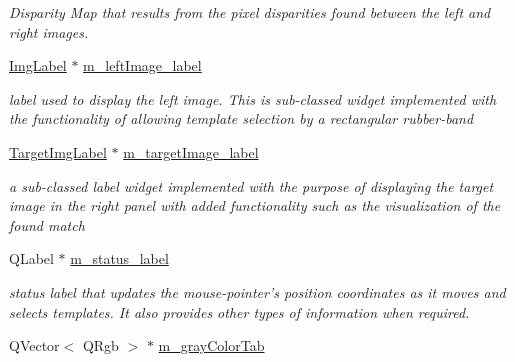 \begin{CompactItemize}
\begin{CompactList}\small\item\em Disparity Map that results from the pixel disparities found between the left and right images. \item\end{CompactList}\item 
\hypertarget{classQcorr_cadb3032fbf41f8f1b27067c2784efef}{
\hyperlink{classImgLabel}{ImgLabel} $\ast$ \hyperlink{classQcorr_cadb3032fbf41f8f1b27067c2784efef}{m\_\-leftImage\_\-label}}
\label{classQcorr_cadb3032fbf41f8f1b27067c2784efef}

\begin{CompactList}\small\item\em label used to display the left image. This is sub-classed widget implemented with the functionality of allowing template selection by a rectangular rubber-band \item\end{CompactList}\item 
\hypertarget{classQcorr_8d1e1ab866a811003c435c45de1e958e}{
\hyperlink{classTargetImgLabel}{TargetImgLabel} $\ast$ \hyperlink{classQcorr_8d1e1ab866a811003c435c45de1e958e}{m\_\-targetImage\_\-label}}
\label{classQcorr_8d1e1ab866a811003c435c45de1e958e}

\begin{CompactList}\small\item\em a sub-classed label widget implemented with the purpose of displaying the target image in the right panel with added functionality such as the visualization of the found match \item\end{CompactList}\item 
\hypertarget{classQcorr_1bf4a70aa6c4e171f2e0613109bb57e9}{
QLabel $\ast$ \hyperlink{classQcorr_1bf4a70aa6c4e171f2e0613109bb57e9}{m\_\-status\_\-label}}
\label{classQcorr_1bf4a70aa6c4e171f2e0613109bb57e9}

\begin{CompactList}\small\item\em status label that updates the mouse-pointer's position coordinates as it moves and selects templates. It also provides other types of information when required. \item\end{CompactList}\item 
\hypertarget{classQcorr_fa1be55387e39ce5b81e72ecab75b5bc}{
QVector$<$ QRgb $>$ $\ast$ \hyperlink{classQcorr_fa1be55387e39ce5b81e72ecab75b5bc}{m\_\-grayColorTab}}
\label{classQcorr_fa1be55387e39ce5b81e72ecab75b5bc}


\end{CompactItemize}
